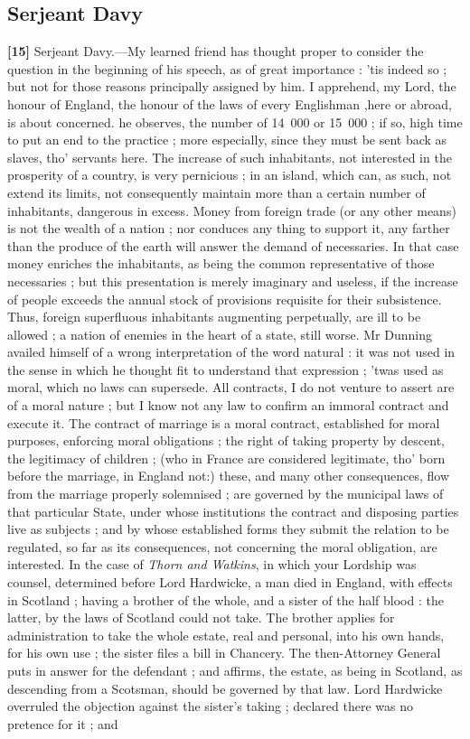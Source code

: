 \documentclass[a4paper]{article}
\begin{document}
\subsection{Serjeant Davy}
\textbf{[15]} Serjeant Davy.---My learned friend has thought proper to consider the question in the beginning of his speech, as of great importance : 'tis indeed so ; but not for those reasons principally assigned by him. I apprehend, my Lord, the honour of England, the honour of the laws of every Englishman ,here or abroad, is about concerned. he observes, the number of 14~000 or 15~000 ; if so, high time to put an end to the practice ; more especially, since they must be sent back as slaves, tho' servants here. The increase of such inhabitants, not interested in the prosperity of  a country, is very pernicious ; in an island, which can, as such, not extend its limits, not consequently maintain more than a certain number of inhabitants, dangerous in excess. Money from foreign trade (or any other means) is not the wealth of a nation ; nor conduces any thing to support it, any farther than the produce of the earth will answer the demand of necessaries. In that case money enriches the inhabitants, as being the common representative of those necessaries ; but this presentation is merely imaginary and useless, if the increase of people exceeds the annual stock of provisions requisite for their subsistence. Thus, foreign superfluous inhabitants augmenting perpetually, are ill to be allowed ; a nation of enemies in the heart of a state, still worse. Mr Dunning availed himself of a wrong interpretation of the word natural : it was not used in the sense in which he thought fit to understand that expression ; 'twas used as moral, which no laws can supersede. All contracts, I do not venture to assert are of a moral nature ; but I know not any law to confirm an immoral contract and execute it. The contract of marriage is a moral contract, established for moral purposes, enforcing moral obligations ; the right of taking property by descent, the legitimacy of children ; (who in France are considered legitimate, tho' born before the marriage, in England not:) these, and many other consequences, flow from the marriage properly solemnised ; are governed by the municipal laws of that particular State, under whose institutions the contract and disposing parties live as subjects ; and by whose established forms they submit the relation to be regulated, so far as its consequences, not concerning the moral obligation, are interested. In the case of \emph{Thorn and Watkins}, in which your Lordship was counsel, determined before Lord Hardwicke, a man died in England, with effects in Scotland ; having a brother of the whole, and a sister of the half blood : the latter, by the laws of Scotland could not take. The brother applies for administration to take the whole estate, real and personal, into his own hands, for his own use ; the sister files a bill in Chancery. The then-Attorney General puts in answer for the defendant ; and affirms, the estate, as being in Scotland, as descending from a Scotsman, should be governed by that law. Lord Hardwicke overruled the objection against the sister's taking ; declared there was no pretence for it ; and 
\end{document}
